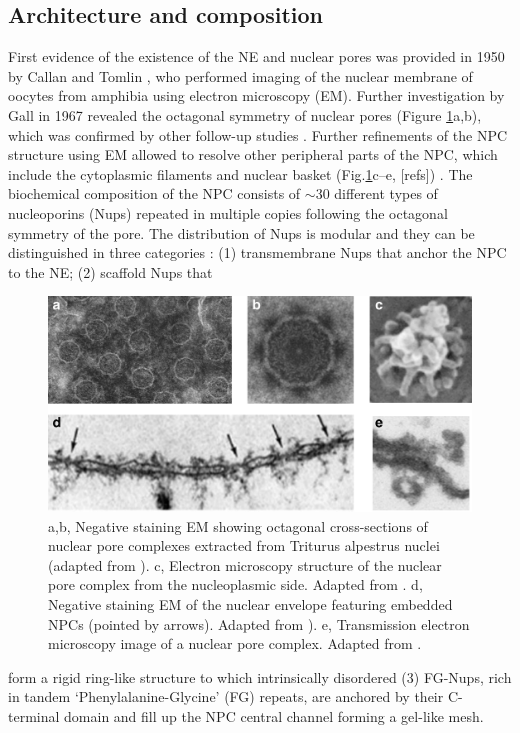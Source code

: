 \subsection{Architecture and composition}
First evidence of the existence of the NE and nuclear pores was provided in 1950 by Callan and Tomlin \cite{CALLAN1950}, who performed imaging of the nuclear membrane of oocytes from amphibia using electron microscopy (EM). 
Further investigation by Gall in 1967 \cite{Gall1967} revealed the octagonal symmetry of nuclear pores (Figure \ref{fig:fig1.2}a,b), which was confirmed by other follow-up studies \cite{Aaronson1974,Franke1970}. Further refinements of the NPC structure using EM allowed to resolve other peripheral parts of the NPC, which include the cytoplasmic filaments and nuclear basket (Fig.\ref{fig:fig1.2}c–e, [refs]) \cite{Goldberg1999,Pante1996}. The biochemical composition of the NPC consists of $\sim$30 different types of nucleoporins (Nups) repeated in multiple copies following the octagonal symmetry of the pore. The distribution of Nups is modular and they can be distinguished in three categories \cite{Devos2006,Onischenko2017}: (1)  transmembrane Nups that anchor the NPC to the NE; (2) scaffold Nups that
\begin{figure}[!hbp]
	\centering
	\includegraphics[width=1\linewidth]{figures/Figure1.2.pdf}
	\caption{a,b, Negative staining EM showing octagonal cross-sections of nuclear pore complexes extracted from Triturus alpestrus nuclei (adapted from \cite{Gall1967}). c, Electron microscopy structure of the nuclear pore complex from the nucleoplasmic side. Adapted from \cite{Goldberg1999}. d,  Negative staining EM of the nuclear envelope featuring embedded NPCs (pointed by arrows). Adapted from \cite{Pante1996}). e, Transmission electron microscopy image of a nuclear pore complex. Adapted from \cite{Lim2008}.}
	\label{fig:fig1.2}
\end{figure}
form a rigid ring-like structure to which intrinsically disordered (3) FG-Nups, rich in tandem ‘Phenylalanine-Glycine’ (FG) repeats, are anchored by their C-terminal domain and fill up the NPC central channel forming a gel-like mesh. 


